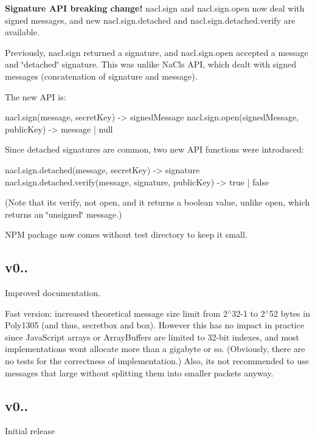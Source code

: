 \begin{DoxyItemize}
\item {\bfseries Signature A\+PI breaking change!} {\ttfamily nacl.\+sign} and {\ttfamily nacl.\+sign.\+open} now deal with signed messages, and new {\ttfamily nacl.\+sign.\+detached} and {\ttfamily nacl.\+sign.\+detached.\+verify} are available.

Previously, {\ttfamily nacl.\+sign} returned a signature, and {\ttfamily nacl.\+sign.\+open} accepted a message and \char`\"{}detached\char`\"{} signature. This was unlike Na\+Cl\textquotesingle{}s A\+PI, which dealt with signed messages (concatenation of signature and message).

The new A\+PI is\+: \begin{DoxyVerb} nacl.sign(message, secretKey) -> signedMessage
 nacl.sign.open(signedMessage, publicKey) -> message | null
\end{DoxyVerb}


Since detached signatures are common, two new A\+PI functions were introduced\+: \begin{DoxyVerb} nacl.sign.detached(message, secretKey) -> signature
 nacl.sign.detached.verify(message, signature, publicKey) -> true | false
\end{DoxyVerb}


(Note that it\textquotesingle{}s {\ttfamily verify}, not {\ttfamily open}, and it returns a boolean value, unlike {\ttfamily open}, which returns an \char`\"{}unsigned\char`\"{} message.)
\item N\+PM package now comes without {\ttfamily test} directory to keep it small.
\end{DoxyItemize}

\subsection*{v0.. }


\begin{DoxyItemize}
\item Improved documentation.
\item Fast version\+: increased theoretical message size limit from 2$^\wedge$32-\/1 to 2$^\wedge$52 bytes in Poly1305 (and thus, secretbox and box). However this has no impact in practice since Java\+Script arrays or Array\+Buffers are limited to 32-\/bit indexes, and most implementations won\textquotesingle{}t allocate more than a gigabyte or so. (Obviously, there are no tests for the correctness of implementation.) Also, it\textquotesingle{}s not recommended to use messages that large without splitting them into smaller packets anyway.
\end{DoxyItemize}

\subsection*{v0.. }


\begin{DoxyItemize}
\item Initial release 
\end{DoxyItemize}